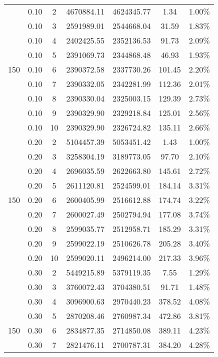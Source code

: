 {\begin{longtable}{cccrrcc}
        & 0.10  & 2     & 4670884.11 & 4624345.77 & 1.34  & 1.00\% \\
        & 0.10  & 3     & 2591989.01 & 2544668.04 & 31.59 & 1.83\% \\
        & 0.10  & 4     & 2402425.55 & 2352136.53 & 91.73 & 2.09\% \\
        & 0.10  & 5     & 2391069.73 & 2344868.48 & 46.93 & 1.93\% \\
  150   & 0.10  & 6     & 2390372.58 & 2337730.26 & 101.45 & 2.20\% \\
        & 0.10  & 7     & 2390332.05 & 2342281.99 & 112.36 & 2.01\% \\
        & 0.10  & 8     & 2390330.04 & 2325003.15 & 129.39 & 2.73\% \\
        & 0.10  & 9     & 2390329.90 & 2329218.84 & 125.01 & 2.56\% \\
        & 0.10  & 10    & 2390329.90 & 2326724.82 & 135.11 & 2.66\% \\
        & 0.20  & 2     & 5104457.39 & 5053451.42 & 1.43  & 1.00\% \\
        & 0.20  & 3     & 3258304.19 & 3189773.05 & 97.70 & 2.10\% \\
        & 0.20  & 4     & 2696035.59 & 2622663.80 & 145.61 & 2.72\% \\
        & 0.20  & 5     & 2611120.81 & 2524599.01 & 184.14 & 3.31\% \\
  150   & 0.20  & 6     & 2600405.99 & 2516612.88 & 174.74 & 3.22\% \\
        & 0.20  & 7     & 2600027.49 & 2502794.94 & 177.08 & 3.74\% \\
        & 0.20  & 8     & 2599035.77 & 2512958.71 & 185.29 & 3.31\% \\
        & 0.20  & 9     & 2599022.19 & 2510626.78 & 205.28 & 3.40\% \\
        & 0.20  & 10    & 2599020.11 & 2496214.00 & 217.33 & 3.96\% \\
        & 0.30  & 2     & 5449215.89 & 5379119.35 & 7.55  & 1.29\% \\
        & 0.30  & 3     & 3760072.43 & 3704380.51 & 91.71 & 1.48\% \\
        & 0.30  & 4     & 3096900.63 & 2970440.23 & 378.52 & 4.08\% \\
        & 0.30  & 5     & 2870208.46 & 2760987.34 & 472.86 & 3.81\% \\
  150   & 0.30  & 6     & 2834877.35 & 2714850.08 & 389.11 & 4.23\% \\
        & 0.30  & 7     & 2821476.11 & 2700787.31 & 384.20 & 4.28\% \\

\end{longtable}}
